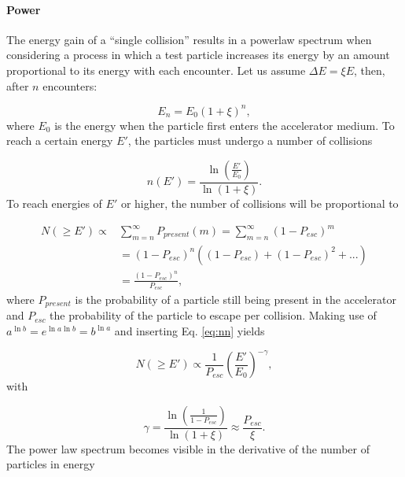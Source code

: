 \paragraph{Power}
\label{para:power}
The energy gain of a ``single collision'' results in a powerlaw spectrum when considering a process in which a test particle increases its energy by an amount proportional to its energy with each encounter. Let us assume $\Delta E = \xi E$, then, after $n$ encounters:

\begin{equation}
E_n = E_0 \left(1+\xi\right)^n,
\end{equation}
where $E_0$ is the energy when the particle first enters the accelerator medium. To reach a certain energy $E'$, the particles must undergo a number of collisions

\begin{equation}
\label{eq:nn}
n(E') = \frac{\ln \left(\frac{E'}{E_0}\right)}{\ln \left(1+\xi \right)}.
\end{equation}
To reach energies of $E'$ or higher, the number of collisions will be proportional to

\begin{equation}
\begin{split}
N(\geq E') \varpropto &\sum^\infty_{m=n} P_{present}(m) = \sum^\infty_{m=n} \left(1-P_{esc} \right)^m\\
&= (1-P_{esc})^n \left((1 - P_{esc}) + (1 - P_{esc})^2 + ...\right) \\
&= \frac{(1-P_{esc})^n}{P_{esc}},
\end{split}
\end{equation}
where $P_{present}$ is the probability of a particle still being present in the accelerator and $P_{esc}$ the probability of the particle to escape per collision. Making use of $a^{\ln b} = e^{\ln a \ln b} = b^{\ln a}$ and inserting Eq. \ref{eq:nn} yields

\begin{equation}
N(\geq E') \varpropto \frac{1}{P_{esc}} \left(\frac{E'}{E_0}\right)^{-\gamma},
\end{equation}
with

\begin{equation}
\gamma = \frac{\ln \left(\frac{1}{1-P_{esc}}\right)}{\ln \left(1 + \xi \right)} \approx \frac{P_{esc}}{\xi}.
\end{equation}
The power law spectrum becomes visible in the derivative of the number of particles in energy

